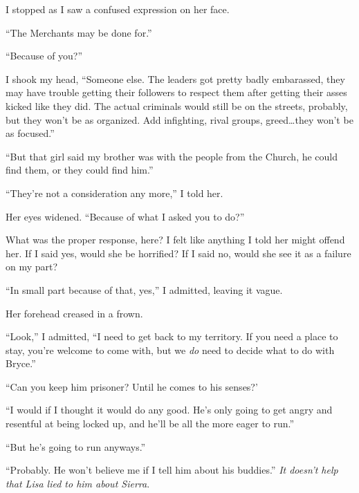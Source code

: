 I stopped as I saw a confused expression on her face.



``The Merchants may be done for.''



``Because of you?''



I shook my head, ``Someone else.  The leaders got pretty badly embarassed, they may have trouble getting their followers to respect them after getting their asses kicked like they did.  The actual criminals would still be on the streets, probably, but they won't be as organized.  Add infighting, rival groups, greed\ldots they won't be as focused.''



``But that girl said my brother was with the people from the Church, he could find them, or they could find him.''



``They're not a consideration any more,'' I told her.



Her eyes widened.  ``Because of what I asked you to do?''



What was the proper response, here?  I felt like anything I told her might offend her.  If I said yes, would she be horrified?  If I said no, would she see it as a failure on my part?



``In small part because of that, yes,'' I admitted, leaving it vague.



Her forehead creased in a frown.



``Look,'' I admitted, ``I need to get back to my territory.  If you need a place to stay, you're welcome to come with, but we \emph{do} need to decide what to do with Bryce.''



``Can you keep him prisoner?  Until he comes to his senses?'



``I would if I thought it would do any good.  He's only going to get angry and resentful at being locked up, and he'll be all the more eager to run.''



``But he's going to run anyways.''



``Probably.  He won't believe me if I tell him about his buddies.''  \emph{It doesn't help that Lisa lied to him about Sierra}.



